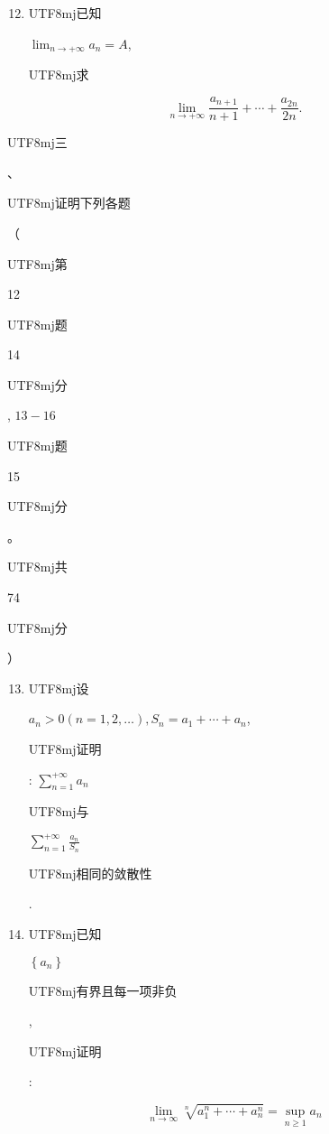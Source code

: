 \documentclass[10pt]{article}
\begin{document}
\begin{enumerate}
  \setcounter{enumi}{11}
  \item \begin{CJK}{UTF8}{mj}已知\end{CJK} $\lim _{n \rightarrow+\infty} a_{n}=A$, \begin{CJK}{UTF8}{mj}求\end{CJK}
\end{enumerate}
$$
\lim _{n \rightarrow+\infty} \frac{a_{n+1}}{n+1}+\cdots+\frac{a_{2 n}}{2 n} .
$$
\begin{CJK}{UTF8}{mj}三\end{CJK}、\begin{CJK}{UTF8}{mj}证明下列各题\end{CJK}（\begin{CJK}{UTF8}{mj}第\end{CJK} 12 \begin{CJK}{UTF8}{mj}题\end{CJK} 14 \begin{CJK}{UTF8}{mj}分\end{CJK}, $13-16$ \begin{CJK}{UTF8}{mj}题\end{CJK} 15 \begin{CJK}{UTF8}{mj}分\end{CJK}。\begin{CJK}{UTF8}{mj}共\end{CJK} 74 \begin{CJK}{UTF8}{mj}分\end{CJK}）

\begin{enumerate}
  \setcounter{enumi}{12}
  \item \begin{CJK}{UTF8}{mj}设\end{CJK} $a_{n}>0(n=1,2, \ldots), S_{n}=a_{1}+\cdots+a_{n}$, \begin{CJK}{UTF8}{mj}证明\end{CJK}: $\sum_{n=1}^{+\infty} a_{n}$ \begin{CJK}{UTF8}{mj}与\end{CJK} $\sum_{n=1}^{+\infty} \frac{a_{n}}{S_{n}}$ \begin{CJK}{UTF8}{mj}相同的敛散性\end{CJK}.

  \item \begin{CJK}{UTF8}{mj}已知\end{CJK} $\left\{a_{n}\right\}$ \begin{CJK}{UTF8}{mj}有界且每一项非负\end{CJK}, \begin{CJK}{UTF8}{mj}证明\end{CJK}:

\end{enumerate}
$$
\lim _{n \rightarrow \infty} \sqrt[n]{a_{1}^{n}+\cdots+a_{n}^{n}}=\sup _{n \geq 1} a_{n}
$$
\end{document}
